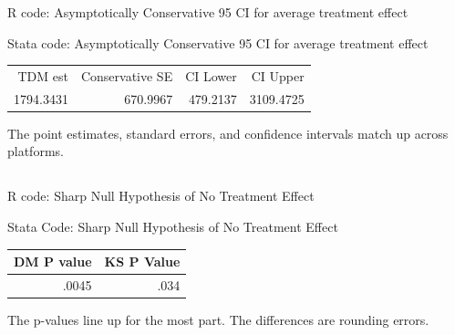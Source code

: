 \documentclass[12pt]{article}
\begin{document}
\subsubsection{}


\begin{center}
  R code: Asymptotically Conservative 95 CI for average treatment effect
  \par

\end{center}


\begin{center}
  Stata code: Asymptotically Conservative 95 CI for average treatment effect
\par
\begin{tabular}{rrrr}
  \hline
TDM est & Conservative SE & CI Lower & CI Upper \\
1794.3431 & 670.9967 & 479.2137 & 3109.4725 \\
\hline
\end{tabular}
\end{center}

The point estimates, standard errors, and confidence intervals match up across platforms.

\subsection{}

\newpage
\subsubsection{}


\begin{center}
  R code: Sharp Null Hypothesis of No Treatment Effect
  \par


\par
Stata Code: Sharp Null Hypothesis of No Treatment Effect
\par

\begin{tabular}{rr}
  \hline
DM P value & KS P Value\\
  \hline
.0045 & .034\\
   \hline
\end{tabular}

\end{center}


The p-values line up for the most part. The differences are rounding errors.
\end{document}
